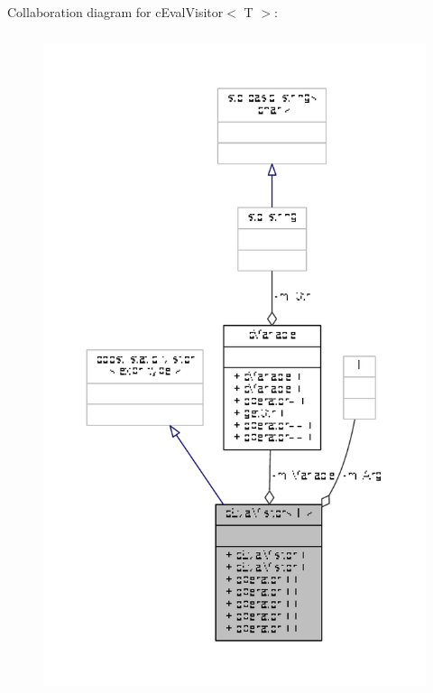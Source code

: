 Collaboration diagram for c\-Eval\-Visitor$<$ T $>$\-:
\nopagebreak
\begin{figure}[H]
\begin{center}
\leavevmode
\includegraphics[height=550pt]{classcEvalVisitor__coll__graph}
\end{center}
\end{figure}
